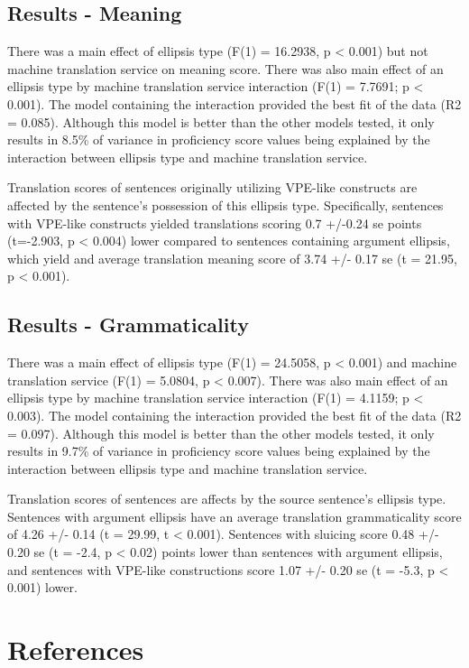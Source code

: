 \documentclass[
  man,floatsintext]{apa6}
\newlength{\cslhangindent}
\newlength{\cslentryspacingunit} %
\newenvironment{CSLReferences}[2] %
 {%
  \setlength{\parindent}{0pt}
  \ifodd #1
  \let\oldpar\par
  \def\par{\hangindent=\cslhangindent\oldpar}
  \fi
  \setlength{\parskip}{#2\cslentryspacingunit}
 }%
 {}
\begin{document}
\hypertarget{results---meaning}{%
\subsection{Results - Meaning}\label{results---meaning}}

There was a main effect of ellipsis type (F(1) = 16.2938, p \textless{} 0.001) but not machine translation service on meaning score. There was also main effect of an ellipsis type by machine translation service interaction (F(1) = 7.7691; p \textless{} 0.001). The model containing the interaction provided the best fit of the data (R2 = 0.085). Although this model is better than the other models tested, it only results in 8.5\% of variance in proficiency score values being explained by the interaction between ellipsis type and machine translation service.

Translation scores of sentences originally utilizing VPE-like constructs are affected by the sentence's possession of this ellipsis type. Specifically, sentences with VPE-like constructs yielded translations scoring 0.7 +/-0.24 se points (t=-2.903, p \textless{} 0.004) lower compared to sentences containing argument ellipsis, which yield and average translation meaning score of 3.74 +/- 0.17 se (t = 21.95, p \textless{} 0.001).

\hypertarget{results---grammaticality}{%
\subsection{Results - Grammaticality}\label{results---grammaticality}}

There was a main effect of ellipsis type (F(1) = 24.5058, p \textless{} 0.001) and machine translation service (F(1) = 5.0804, p \textless{} 0.007). There was also main effect of an ellipsis type by machine translation service interaction (F(1) = 4.1159; p \textless{} 0.003). The model containing the interaction provided the best fit of the data (R2 = 0.097). Although this model is better than the other models tested, it only results in 9.7\% of variance in proficiency score values being explained by the interaction between ellipsis type and machine translation service.

Translation scores of sentences are affects by the source sentence's ellipsis type. Sentences with argument ellipsis have an average translation grammaticality score of 4.26 +/- 0.14 (t = 29.99, t \textless{} 0.001). Sentences with sluicing score 0.48 +/- 0.20 se (t = -2.4, p \textless{} 0.02) points lower than sentences with argument ellipsis, and sentences with VPE-like constructions score 1.07 +/- 0.20 se (t = -5.3, p \textless{} 0.001) lower.

\newpage

\hypertarget{references}{%
\section{References}\label{references}}

\hypertarget{refs}{}
\begin{CSLReferences}{0}{0}
\end{CSLReferences}
\end{document}
